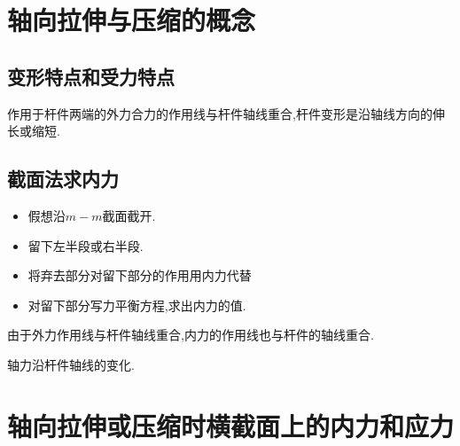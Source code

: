 \section{轴向拉伸与压缩的概念}
\subsection{变形特点和受力特点}
作用于杆件两端的外力合力的作用线与杆件轴线重合,杆件变形是沿轴线方向的伸长或缩短.

\subsection{截面法求内力}
\begin{method}
	\begin{itemize}
		\item 假想沿$m-m$截面截开.
		\item 留下左半段或右半段.
		\item 将弃去部分对留下部分的作用用内力代替
		\item 对留下部分写力平衡方程,求出内力的值.
	\end{itemize}
\end{method}

\begin{definition}[轴\index{ZL@轴力}力]
	由于外力作用线与杆件轴线重合,内力的作用线也与杆件的轴线重合.\\
\end{definition}

\begin{definition}
	轴力沿杆件轴线的变化.
\end{definition}
\section{轴向拉伸或压缩时横截面上的内力和应力} 

















